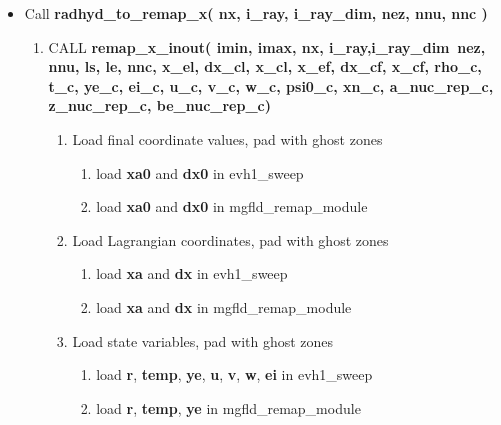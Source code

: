 \documentclass[11pt,doublespace]{article}
\begin{document}
\begin{itemize}

\item Call {\bf radhyd\_to\_remap\_x( nx, i\_ray, i\_ray\_dim, nez, nnu, nnc )}

\begin{enumerate}

  \item CALL {\bf remap\_x\_inout( imin, imax, nx, i\_ray,i\_ray\_dim\, nez, nnu, ls, le, nnc, x\_el, dx\_cl, x\_cl, x\_ef, dx\_cf, x\_cf, rho\_c, t\_c, ye\_c, ei\_c, u\_c, v\_c, w\_c, psi0\_c, xn\_c, a\_nuc\_rep\_c, z\_nuc\_rep\_c, be\_nuc\_rep\_c)}

\begin{enumerate}

  \item Load final coordinate values, pad with ghost zones

\begin{enumerate}

  \item load {\bf xa0} and {\bf dx0} in evh1\_sweep

  \item load {\bf xa0} and {\bf dx0} in mgfld\_remap\_module

\end{enumerate}

  \item Load Lagrangian coordinates, pad with ghost zones

\begin{enumerate}

  \item load {\bf xa} and {\bf dx} in evh1\_sweep

  \item load {\bf xa} and {\bf dx} in mgfld\_remap\_module

\end{enumerate}

  \item Load state variables, pad with ghost zones

\begin{enumerate}

  \item load {\bf r}, {\bf temp}, {\bf ye}, {\bf u}, {\bf v}, {\bf w}, {\bf ei} in evh1\_sweep

  \item load {\bf r}, {\bf temp}, {\bf ye}  in mgfld\_remap\_module

\end{enumerate}


\end{enumerate}
\end{enumerate}
\end{itemize}
\end{document}
